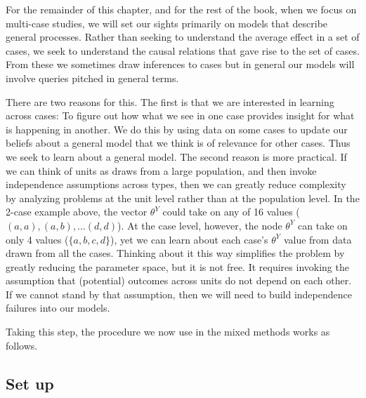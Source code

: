 \documentclass[
  12pt,
]{book}
\begin{document}
For the remainder of this chapter, and for the rest of the book, when we focus on multi-case studies, we will set our sights primarily on models that describe general processes. Rather than seeking to understand the average effect in a set of cases, we seek to understand the causal relations that gave rise to the set of cases. From these we sometimes draw inferences to cases but in general our models will involve queries pitched in general terms.

There are two reasons for this. The first is that we are interested in learning across cases: To figure out how what we see in one case provides insight for what is happening in another. We do this by using data on some cases to update our beliefs about a general model that we think is of relevance for other cases. Thus we seek to learn about a general model. The second reason is more practical. If we can think of units as draws from a large population, and then invoke independence assumptions across types, then we can greatly reduce complexity by analyzing problems at the unit level rather than at the population level. In the 2-case example above, the vector \(\theta^Y\) could take on any of 16 values (\((a,a), (a,b),\dots (d,d)\)). At the case level, however, the node \(\theta^Y\) can take on only 4 values (\(\{a,b,c,d\}\)), yet we can learn about each case's \(\theta^Y\) value from data drawn from all the cases. Thinking about it this way simplifies the problem by greatly reducing the parameter space, but it is not free. It requires invoking the assumption that (potential) outcomes across units do not depend on each other. If we cannot stand by that assumption, then we will need to build independence failures into our models.

Taking this step, the procedure we now use in the mixed methods works as follows.

\hypertarget{set-up}{%
\subsection{Set up}\label{set-up}}
\end{document}
